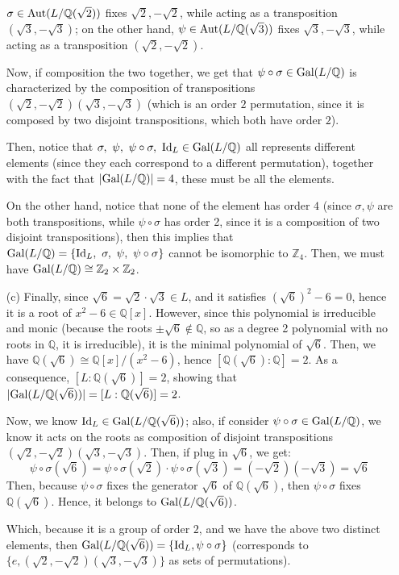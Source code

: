 \documentclass{article}
\newcommand{\ZZ}{\mathbb{Z}}
\newcommand{\QQ}{\mathbb{Q}}
\newcommand{\Id}{\textmd{Id}}
\newcommand{\Gal}{\textmd{Gal}}
\newcommand{\Aut}{\textmd{Aut}}
\begin{document}
\begin{itemize}
    $\sigma\in \Aut(L/\QQ(\sqrt{2}))$ fixes $\sqrt{2},-\sqrt{2}$, while acting as a transposition $(\sqrt{3},-\sqrt{3})$; on the other hand, $\psi\in \Aut(L/\QQ(\sqrt{3}))$ fixes $\sqrt{3},-\sqrt{3}$, while acting as a transposition $(\sqrt{2},-\sqrt{2})$.

    Now, if composition the two together, we get that $\psi\circ \sigma \in \Gal(L/\QQ)$ is characterized by the composition of transpositions $(\sqrt{2},-\sqrt{2})(\sqrt{3},-\sqrt{3})$ (which is an order $2$ permutation, since it is composed by two disjoint transpositions, which both have order $2$).

    Then, notice that $\sigma,\ \psi,\ \psi\circ \sigma,\ \Id_L\in \Gal(L/\QQ)$ all represents different elements (since they each correspond to a different permutation), together with the fact that $|\Gal(L/\QQ)|=4$, these must be all the elements.
    
    On the other hand, notice that none of the element has order $4$ (since $\sigma,\psi$ are both transpositions, while $\psi\circ \sigma$ has order 2, since it is a composition of two disjoint transpositions), then this implies that $\Gal(L/\QQ)=\{\Id_L,\ \sigma,\ \psi,\ \psi\circ\sigma\}$ cannot be isomorphic to $\ZZ_4$.
    Then, we must have $\Gal(L/\QQ)\cong \ZZ_2\times \ZZ_2$.

    \item[(c)] Finally, since $\sqrt{6} = \sqrt{2}\cdot\sqrt{3}\in L$, and it satisfies $(\sqrt{6})^2-6=0$, hence it is a root of $x^2-6\in\QQ[x]$. However, since this polynomial is irreducible and monic (because the roots $\pm\sqrt{6}\notin \QQ$, so as a degree 2 polynomial with no roots in $\QQ$, it is irreducible), it is the minimal polynomial of $\sqrt{6}$. Then, we have $\QQ(\sqrt{6})\cong \QQ[x]/(x^2-6)$, hence $[\QQ(\sqrt{6}):\QQ]=2$. As a consequence, $[L:\QQ(\sqrt{6})]=2$, showing that $|\Gal(L/\QQ(\sqrt{6}))|=[L:\QQ(\sqrt{6})]=2$.
    
    Now, we know $\Id_L\in \Gal(L/\QQ(\sqrt{6}))$; also, if consider $\psi\circ\sigma\in \Gal(L/\QQ)$, we know it acts on the roots as composition of disjoint transpositions $(\sqrt{2},-\sqrt{2})(\sqrt{3},-\sqrt{3})$. Then, if plug in $\sqrt{6}$, we get:
    \begin{equation}
        \label{eq:7}
        \psi\circ\sigma(\sqrt{6})=\psi\circ\sigma(\sqrt{2})\cdot\psi\circ\sigma(\sqrt{3}) = (-\sqrt{2})(-\sqrt{3})=\sqrt{6}
    \end{equation}
    Then, because $\psi\circ\sigma$ fixes the generator $\sqrt{6}$ of $\QQ(\sqrt{6})$, then $\psi\circ\sigma$ fixes $\QQ(\sqrt{6})$. Hence, it belongs to $\Gal(L/\QQ(\sqrt{6}))$.

    Which, because it is a group of order $2$, and we have the above two distinct elements, then $\Gal(L/\QQ(\sqrt{6}))=\{\Id_L, \psi\circ\sigma\}$ (corresponds to $\{e,(\sqrt{2},-\sqrt{2})(\sqrt{3},-\sqrt{3})\}$ as sets of permutations).
\end{itemize}
\end{document}
